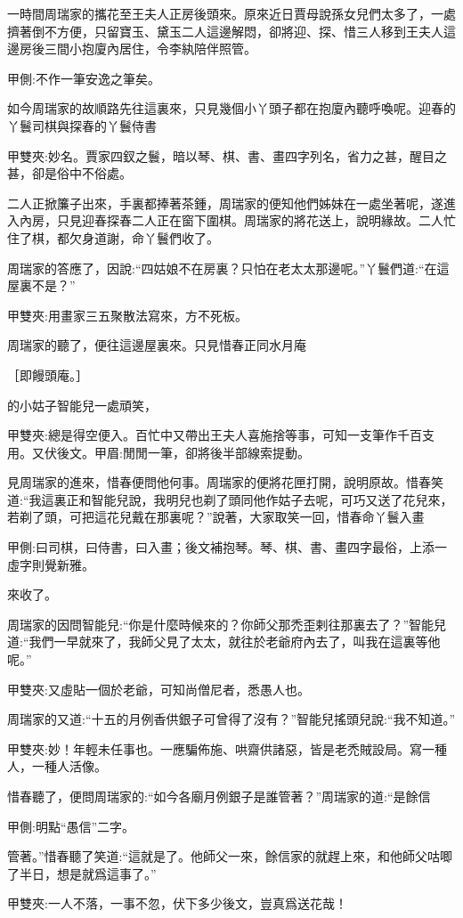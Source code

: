 \begin{parag}
    一時間周瑞家的攜花至王夫人正房後頭來。原來近日賈母說孫女兒們太多了，一處擠著倒不方便，只留寶玉、黛玉二人這邊解悶，卻將迎、探、惜三人移到王夫人這邊房後三間小抱廈內居住，令李紈陪伴照管。\begin{note}甲側:不作一筆安逸之筆矣。\end{note}如今周瑞家的故順路先往這裏來，只見幾個小丫頭子都在抱廈內聽呼喚呢。迎春的丫鬟司棋與探春的丫鬟侍書\begin{note}甲雙夾:妙名。賈家四釵之鬟，暗以琴、棋、書、畫四字列名，省力之甚，醒目之甚，卻是俗中不俗處。\end{note}二人正掀簾子出來，手裏都捧著茶鍾，周瑞家的便知他們姊妹在一處坐著呢，遂進入內房，只見迎春探春二人正在窗下圍棋。周瑞家的將花送上，說明緣故。二人忙住了棋，都欠身道謝，命丫鬟們收了。
\end{parag}


\begin{parag}
    周瑞家的答應了，因說:“四姑娘不在房裏？只怕在老太太那邊呢。”丫鬟們道:“在這屋裏不是？”\begin{note}甲雙夾:用畫家三五聚散法寫來，方不死板。\end{note}周瑞家的聽了，便往這邊屋裏來。只見惜春正同水月庵\begin{note}［即饅頭庵。］\end{note}的小姑子智能兒一處頑笑，\begin{note}甲雙夾:總是得空便入。百忙中又帶出王夫人喜施捨等事，可知一支筆作千百支用。又伏後文。甲眉:閒閒一筆，卻將後半部線索提動。\end{note}見周瑞家的進來，惜春便問他何事。周瑞家的便將花匣打開，說明原故。惜春笑道:“我這裏正和智能兒說，我明兒也剃了頭同他作姑子去呢，可巧又送了花兒來，若剃了頭，可把這花兒戴在那裏呢？”說著，大家取笑一回，惜春命丫鬟入畫\begin{note}甲側:曰司棋，曰侍書，曰入畫；後文補抱琴。琴、棋、書、畫四字最俗，上添一虛字則覺新雅。\end{note}來收了。
\end{parag}


\begin{parag}
    周瑞家的因問智能兒:“你是什麼時候來的？你師父那禿歪剌往那裏去了？”智能兒道:“我們一早就來了，我師父見了太太，就往於老爺府內去了，叫我在這裏等他呢。”\begin{note}甲雙夾:又虛貼一個於老爺，可知尚僧尼者，悉愚人也。\end{note}周瑞家的又道:“十五的月例香供銀子可曾得了沒有？”智能兒搖頭兒說:“我不知道。”\begin{note}甲雙夾:妙！年輕未任事也。一應騙佈施、哄齋供諸惡，皆是老禿賊設局。寫一種人，一種人活像。\end{note}惜春聽了，便問周瑞家的:“如今各廟月例銀子是誰管著？”周瑞家的道:“是餘信\begin{note}甲側:明點“愚信”二字。\end{note}管著。”惜春聽了笑道:“這就是了。他師父一來，餘信家的就趕上來，和他師父咕唧了半日，想是就爲這事了。”\begin{note}甲雙夾:一人不落，一事不忽，伏下多少後文，豈真爲送花哉！\end{note}
\end{parag}


